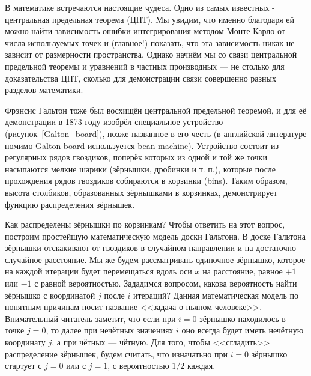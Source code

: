 \documentclass{book}
\begin{document}
В математике встречаются настоящие чудеса. Одно из самых известных - центральная предельная теорема
(ЦПТ). Мы увидим, что именно благодаря ей можно найти зависимость ошибки интегрирования методом
Монте-Карло от числа используемых точек и (главное!) показать, что эта зависимость никак не зависит
от размерности пространства. Однако начнём мы со связи центральной предельной теоремы и уравнений в
частных производных --- не столько для доказательства ЦПТ, сколько для демонстрации связи
совершенно разных разделов математики.

Фрэнсис Гальтон тоже был восхищён центральной предельной теоремой, и для её демонстрации в 1873
году изобрёл специальное устройство (рисунок~\ref{Galton_board}), позже названное в его честь (в
английской литературе помимо Galton board используется bean machine). Устройство состоит из
регулярных рядов гвоздиков, поперёк которых из одной и той же точки насыпаются мелкие шарики
(зёрнышки, дробинки и т. п.), которые после прохождения рядов гвоздиков собираются в корзинки
(bins). Таким образом, высота столбиков, образованных зёрнышками в корзинках, демонстрирует функцию
распределения зёрнышек.

Как распределены зёрнышки по корзинкам? Чтобы ответить на этот вопрос, построим простейшую
математическую модель доски Гальтона. В доске Гальтона зёрнышки отскакивают от гвоздиков в
случайном направлении и на достаточно случайное расстояние. Мы же будем рассматривать одиночное
зёрнышко, которое на каждой итерации будет перемещаться вдоль оси $x$ на расстояние, равное $+1$
или $-1$ с равной вероятностью. Зададимся вопросом, какова вероятность найти зёрнышко с координатой
$j$ после $i$ итераций?  Данная математическая модель по понятным причинам носит название
<<задача о пьяном человеке>>.  Внимательный читатель заметит, что если при $i = 0$ зёрнышко
находилось в точке $j = 0$, то далее при нечётных значениях $i$ оно всегда будет иметь нечётную
координату $j$, а при чётных --- чётную.  Для того, чтобы <<сгладить>> распределение зёрнышек,
будем считать, что изначатьно при $i = 0$ зёрнышко стартует с $j = 0$ или с $j = 1$, с вероятностью
$1/2$ каждая.
\end{document}
